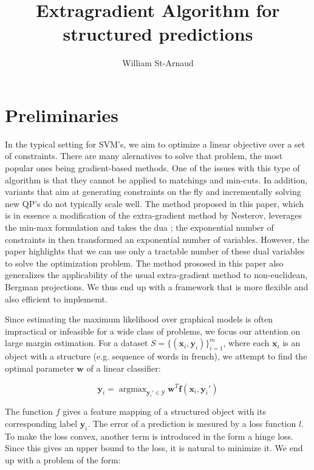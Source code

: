 \documentclass{article}
\title{Extragradient Algorithm for structured predictions}
\author{William St-Arnaud}
\DeclareMathOperator*{\argmax}{\arg\max}
\renewcommand{\vec}{\mathbf}
\begin{document}
\maketitle

\section{Preliminaries}

In the typical setting for SVM's, we aim to optimize a linear objective over a
set of constraints. There are many alernatives to solve that problem, the most
popular ones being gradient-based methods. One of the issues with this type of
algorithm is that they cannot be applied to matchings and min-cuts. In addition,
variants that aim at generating constraints on the fly and incrementally solving
new QP's do not typically scale well. The method proposed in this paper, which
is in essence a modification of the extra-gradient method by Nesterov, leverages
the min-max formulation and takes the dua ; the exponential number of
constraints in then transformed an exponential number of variables. However, the
paper highlights that we can use only a tractable number of these dual variables
to solve the optimization problem. The method prososed in this paper also
generalizes the applicability of the usual extra-gradient method to
non-euclidean, Bergman projections. We thus end up with a framework that is more
flexible and also efficient to implememt.

Since estimating the maximum likelihood over graphical models is often
impractical or infeasible for a wide class of problems, we focus our attention
on large margin estimation. For a dataset $ S = \{ (\vec x_i, \vec y_i) \}_{i=1}^{m} $,
where each $\vec x_i$ is an object with a structure (e.g. sequence of words in
french), we attempt to find the optimal parameter $\vec w$ of a linear classifier:

\begin{equation}
  \vec y_i = \argmax_{\vec y_i' \in \mathcal{Y}} \vec w^T \vec f(\vec x_i,\vec y_i')
  \label{eq1}
\end{equation}

The function $f$ gives a feature mapping of a structured object with its
corresponding label $\vec y_i$. The error of a prediction is mesured by a loss
function $l$. To make the loss convex, another term is introduced in the form a
hinge loss. Since this gives an upper bound to the loss, it is natural to
minimize it. We end up with a problem of the form:
\end{document}
